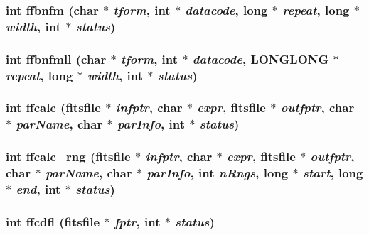 \subsubsection{\setlength{\rightskip}{0pt plus 5cm}int ffbnfm (char $\ast$ {\em tform}, int $\ast$ {\em datacode}, long $\ast$ {\em repeat}, long $\ast$ {\em width}, int $\ast$ {\em status})}\label{fitsio__64_8h_cfe4b7969d8e7484d15510380edd2b57}


\subsubsection{\setlength{\rightskip}{0pt plus 5cm}int ffbnfmll (char $\ast$ {\em tform}, int $\ast$ {\em datacode}, \bf{LONGLONG} $\ast$ {\em repeat}, long $\ast$ {\em width}, int $\ast$ {\em status})}\label{fitsio__64_8h_63407aabf5d249931c496d2b4029a188}


\subsubsection{\setlength{\rightskip}{0pt plus 5cm}int ffcalc (\bf{fitsfile} $\ast$ {\em infptr}, char $\ast$ {\em expr}, \bf{fitsfile} $\ast$ {\em outfptr}, char $\ast$ {\em par\-Name}, char $\ast$ {\em par\-Info}, int $\ast$ {\em status})}\label{fitsio__64_8h_c546ca394e9c86991b46a6f6c420f7bf}


\subsubsection{\setlength{\rightskip}{0pt plus 5cm}int ffcalc\_\-rng (\bf{fitsfile} $\ast$ {\em infptr}, char $\ast$ {\em expr}, \bf{fitsfile} $\ast$ {\em outfptr}, char $\ast$ {\em par\-Name}, char $\ast$ {\em par\-Info}, int {\em n\-Rngs}, long $\ast$ {\em start}, long $\ast$ {\em end}, int $\ast$ {\em status})}\label{fitsio__64_8h_fb304389717fe2041f1b59c7acc85249}


\subsubsection{\setlength{\rightskip}{0pt plus 5cm}int ffcdfl (\bf{fitsfile} $\ast$ {\em fptr}, int $\ast$ {\em status})}\label{fitsio__64_8h_e14237195c7eca6e7dd93690762d20db}


